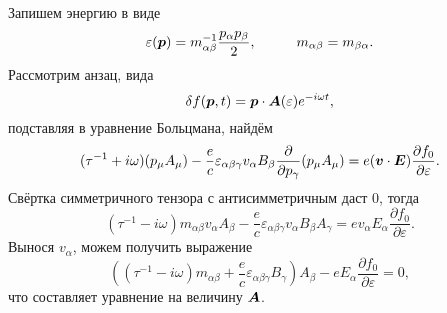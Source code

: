 Запишем энергию в виде
\begin{equation*}
	\varepsilon(\vc{p}) = m_{\alpha \beta}^{-1} \frac{p_\alpha p_\beta}{2},
	\hspace{10 mm} 
	m_{\alpha \beta} = m_{\beta \alpha}.
\end{equation*}
Рассмотрим анзац, вида
\begin{equation*}
	\delta f(\boldsymbol{p}, t) = \boldsymbol{p} \cdot \boldsymbol{A}(\varepsilon) e^{- i \omega t},
\end{equation*}
подставляя в уравнение Больцмана, найдём
\begin{equation*}
	(\tau^{-1} + i \omega) (p_\mu A_\mu) - \frac{e}{c} \varepsilon_{\alpha \beta \gamma} v_\alpha B_\beta \frac{\partial }{\partial p_\gamma}  (p_\mu A_\mu) = e (\boldsymbol{v} \cdot \boldsymbol{E}) \frac{\partial f_0}{\partial \varepsilon}.
\end{equation*}
Свёртка симметричного тензора с антисимметричным даст 0, тогда
\begin{equation*}
	(\tau^{-1} - i \omega) m_{\alpha \beta} v_\alpha A_\beta - \frac{e}{c} \varepsilon_{\alpha \beta \gamma} v_\alpha B_{\beta} A_\gamma = e v_\alpha E_\alpha \frac{\partial f_0}{\partial \varepsilon}.
\end{equation*}
Вынося $v_\alpha$, можем получить выражение
\begin{equation*}
	\left(
		(\tau^{-1} - i \omega) m_{\alpha \beta} + \frac{e}{c} \varepsilon_{\alpha \beta \gamma} B_\gamma
	\right) A_\beta - e E_\alpha \frac{\partial f_0}{\partial \varepsilon} = 0,
\end{equation*}
что составляет уравнение на величину $\boldsymbol{A}$. 

